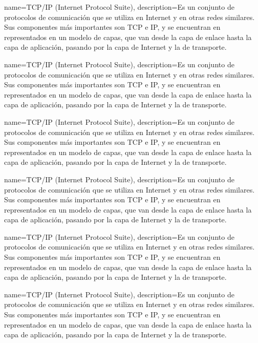 {name=TCP/IP (Internet Protocol Suite),
 description={Es un conjunto de protocolos de comunicación que se utiliza en Internet y en otras redes similares. Sus componentes más importantes son TCP e IP, y se encuentran en representados en un modelo de capas, que van desde la capa de enlace hasta la capa de aplicación, pasando por la capa de Internet y la de transporte.}
 }
 
{name=TCP/IP (Internet Protocol Suite),
 description={Es un conjunto de protocolos de comunicación que se utiliza en Internet y en otras redes similares. Sus componentes más importantes son TCP e IP, y se encuentran en representados en un modelo de capas, que van desde la capa de enlace hasta la capa de aplicación, pasando por la capa de Internet y la de transporte.}
 }
 
{name=TCP/IP (Internet Protocol Suite),
 description={Es un conjunto de protocolos de comunicación que se utiliza en Internet y en otras redes similares. Sus componentes más importantes son TCP e IP, y se encuentran en representados en un modelo de capas, que van desde la capa de enlace hasta la capa de aplicación, pasando por la capa de Internet y la de transporte.}
 }
 
{name=TCP/IP (Internet Protocol Suite),
 description={Es un conjunto de protocolos de comunicación que se utiliza en Internet y en otras redes similares. Sus componentes más importantes son TCP e IP, y se encuentran en representados en un modelo de capas, que van desde la capa de enlace hasta la capa de aplicación, pasando por la capa de Internet y la de transporte.}
 }
 
{name=TCP/IP (Internet Protocol Suite),
 description={Es un conjunto de protocolos de comunicación que se utiliza en Internet y en otras redes similares. Sus componentes más importantes son TCP e IP, y se encuentran en representados en un modelo de capas, que van desde la capa de enlace hasta la capa de aplicación, pasando por la capa de Internet y la de transporte.}
 }
 
{name=TCP/IP (Internet Protocol Suite),
 description={Es un conjunto de protocolos de comunicación que se utiliza en Internet y en otras redes similares. Sus componentes más importantes son TCP e IP, y se encuentran en representados en un modelo de capas, que van desde la capa de enlace hasta la capa de aplicación, pasando por la capa de Internet y la de transporte.}
 }
 
